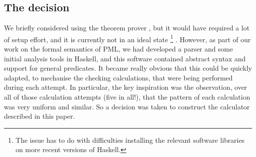 \subsection{The decision}

We briefly considered using the  theorem prover
\cite{DBLP:conf/utp/Butterfield10,DBLP:conf/utp/Butterfield12},
but it would have required a lot of setup effort,
and it is currently not in an ideal state%
\footnote{The issue has to do with difficulties installing
the relevant software libraries
on more recent versions of Haskell.}
.
However, as part of our work on the formal semantics of PML,
we had developed a parser and some initial analysis tools
in Haskell\cite{Haskell2010},
and this software contained abstract syntax and support
for general predicates.
It became really obvious that this could be quickly adapted,
to mechanise the checking calculations, that were being performed
during each attempt.
In particular,
the key inspiration was the observation,
over all of those calculation attempts (five in all!),
that the pattern of each calculation was very uniform and similar.
So a decision was taken to construct the calculator described in this paper.
